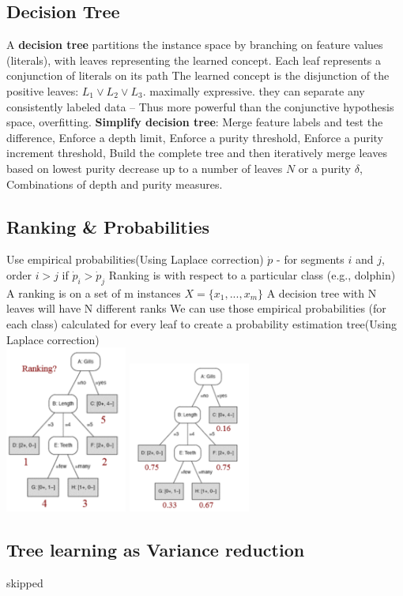 \documentclass[cheatsheet.tex]{subfiles}
\begin{document}
\subsection{Decision Tree}
A \textbf{decision tree} partitions the instance space by branching on feature values (literals), with leaves representing the learned concept. \textbullet Each leaf represents a conjunction of literals on its path \textbullet The learned concept is the disjunction of the positive leaves: $L_1 \vee{L_2} \vee{L_3}$. \textbullet maximally expressive. they
can separate any consistently labeled data -- Thus more powerful than the conjunctive hypothesis space, overfitting.
\textbullet \textbf{Simplify decision tree}: Merge feature labels and test the difference, Enforce a depth limit, Enforce a purity threshold, Enforce a purity increment threshold, Build the complete tree and then iteratively merge leaves based on lowest purity decrease up to a number of leaves $N$ or a purity $\delta$, Combinations of depth and purity measures.
\subsection{Ranking \& Probabilities}
\textbullet Use empirical probabilities(Using Laplace correction) $\dot{p}$ - for segments $i$ and $j$, order $i>j$ if $\dot{p}_i>\dot{p}_j$ \textbullet Ranking is with respect to a particular class (e.g., dolphin) \textbullet A ranking is on a set of m instances  $X = \{ x_1, ..., x_m \}$ \textbullet A decision tree with N leaves will have N different ranks \textbullet We can use those empirical probabilities (for each class) calculated for every leaf to create a probability estimation tree(Using Laplace correction)\\
\includegraphics[width=40mm]{ranking_tree.png} \includegraphics[width=40mm]{probability_tree.png}
\subsection{Tree learning as Variance reduction}
skipped
\end{document}
